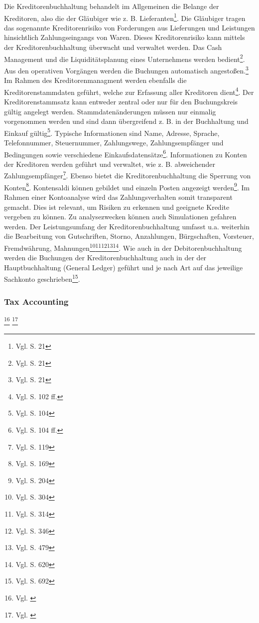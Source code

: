 Die Kreditorenbuchhaltung behandelt im Allgemeinen die Belange der Kreditoren, also die der Gläubiger wie z. B. Lieferanten\footnote{Vgl. \cite{SAPFIAPAR2001} S. 21}. Die Gläubiger tragen das sogenannte Kreditorenrisiko von Forderungen aus Lieferungen und Leistungen hinsichtlich Zahlungseingangs von Waren. Dieses Kreditorenrisiko kann mittels der Kreditorenbuchhaltung überwacht und verwaltet werden. Das Cash Management und die Liquiditätsplanung eines Unternehmens werden bedient\footnote{Vgl. \cite{SAPFIAPAR2001} S. 21}. \glqq Aus den operativen Vorgängen werden die Buchungen automatisch angestoßen.\grqq \footnote{Vgl. \cite{SAPFIAPAR2001} S. 21} 
Im Rahmen des Kreditorenmanagment werden ebenfalls die Kreditorenstammdaten geführt, welche zur Erfassung aller Kreditoren dient\footnote{Vgl. \cite{SAPFIAPAR2001} S. 102 ff.}. Der Kreditorenstammsatz kann entweder zentral oder nur für den Buchungskreis gültig angelegt werden. Stammdatenänderungen müssen nur einmalig vorgenommen werden und sind dann übergreifend z. B. in der Buchhaltung und Einkauf gültig\footnote{Vgl. \cite{SAPFIAPAR2001} S. 104}. Typische Informationen sind Name, Adresse, Sprache, Telefonnummer, Steuernummer, Zahlungswege, Zahlungsempfänger und Bedingungen sowie verschiedene Einkaufsdatensätze\footnote{Vgl. \cite{SAPFIAPAR2001} S. 104 ff.}.
Informationen zu Konten der Kreditoren werden geführt und verwaltet, wie z. B. abweichender Zahlungsempfänger\footnote{Vgl. \cite{SAPFIAPAR2001} S. 119}. Ebenso bietet die Kreditorenbuchhaltung die Sperrung von Konten\footnote{Vgl. \cite{SAPFIAPAR2001} S. 169}. Kontensaldi können gebildet und einzeln Posten angezeigt werden\footnote{Vgl. \cite{SAPFIAPAR2001} S. 204}. Im Rahmen einer Kontoanalyse wird das Zahlungsverhalten somit transparent gemacht. Dies ist relevant, um Risiken zu erkennen und geeignete Kredite vergeben zu können. Zu analysezwecken können auch Simulationen gefahren werden. Der Leistungsumfang der Kreditorenbuchhaltung umfasst u.a. weiterhin die Bearbeitung von Gutschriften, Storno, Anzahlungen, Bürgschaften, Vorsteuer, Fremdwährung, Mahnungen\footnote{Vgl. \cite{SAPFIAPAR2001} S. 304}\footnote{Vgl. \cite{SAPFIAPAR2001} S. 314}\footnote{Vgl. \cite{SAPFIAPAR2001} S. 346}\footnote{Vgl. \cite{SAPFIAPAR2001} S. 479}\footnote{Vgl. \cite{SAPFIAPAR2001} S. 620}.
Wie auch in der Debitorenbuchhaltung werden die Buchungen der Kreditorenbuchhaltung auch in der der Hauptbuchhaltung (General Ledger) geführt und je nach Art auf das jeweilige Sachkonto geschrieben\footnote{Vgl. \cite{SAPFIAPAR2001} S. 692}.


\subsubsection{Tax Accounting} %
\footnote{Vgl. \cite{SAPFIAPAR2006}} %
\footnote{Vgl. \cite{Patel2009}}


